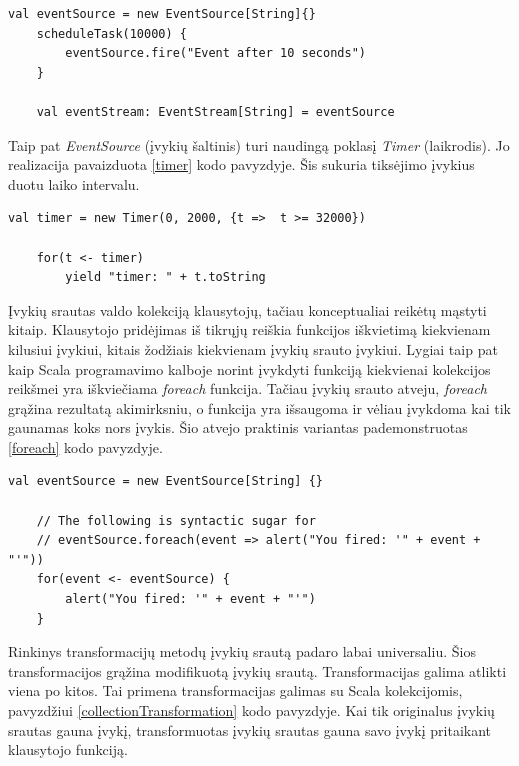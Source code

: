 \begin{lstlisting}[caption=- įvykių srauto sukūrimas, label=creation]
	val eventSource = new EventSource[String]{}
	scheduleTask(10000) {
		eventSource.fire("Event after 10 seconds")
	}

	val eventStream: EventStream[String] = eventSource
\end{lstlisting}

Taip pat \textit{EventSource} (įvykių šaltinis) turi naudingą poklasį \textit{Timer} (laikrodis). Jo realizacija pavaizduota \ref{timer} kodo pavyzdyje. Šis sukuria tiksėjimo įvykius duotu laiko intervalu.

\begin{lstlisting}[caption=- įvykių srauto sukūrimas, label=timer]
	val timer = new Timer(0, 2000, {t =>  t >= 32000})

	for(t <- timer)
    	yield "timer: " + t.toString
\end{lstlisting}

Įvykių srautas valdo kolekciją klausytojų, tačiau konceptualiai reikėtų mąstyti kitaip. Klausytojo pridėjimas iš tikrųjų reiškia funkcijos iškvietimą kiekvienam kilusiui įvykiui, kitais žodžiais kiekvienam įvykių srauto įvykiui. Lygiai taip pat kaip Scala programavimo kalboje norint įvykdyti funkciją kiekvienai kolekcijos reikšmei yra iškviečiama \textit{foreach} funkcija. Tačiau įvykių srauto atveju, \textit{foreach} grąžina rezultatą akimirksniu, o funkcija yra išsaugoma ir vėliau įvykdoma kai tik gaunamas koks nors įvykis. Šio atvejo praktinis variantas pademonstruotas \ref{foreach} kodo pavyzdyje.

\begin{lstlisting}[caption=- klausytojų pridėjimas, label=foreach]
	val eventSource = new EventSource[String] {}
	  
	// The following is syntactic sugar for
	// eventSource.foreach(event => alert("You fired: '" + event + "'"))
	for(event <- eventSource) {
	 	alert("You fired: '" + event + "'")
	}

\end{lstlisting}

Rinkinys transformacijų metodų įvykių srautą padaro labai universaliu. Šios transformacijos grąžina modifikuotą įvykių srautą. Transformacijas galima atlikti viena po kitos. Tai primena transformacijas galimas su Scala kolekcijomis, pavyzdžiui \ref{collectionTransformation} kodo pavyzdyje. Kai tik originalus įvykių srautas gauna įvykį, transformuotas įvykių srautas gauna savo įvykį pritaikant klausytojo funkciją.

